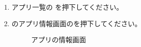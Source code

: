 \begin{enumerate}
        \newpage
        \item アプリ一覧の \bj を押下してください。
        \item \bj のアプリ情報画面のを押下してください。
            \begin{figure}[htbp]
                \centering
                \caption{アプリの情報画面}
                \label{img:battery2}
            \end{figure}


\end{enumerate}
